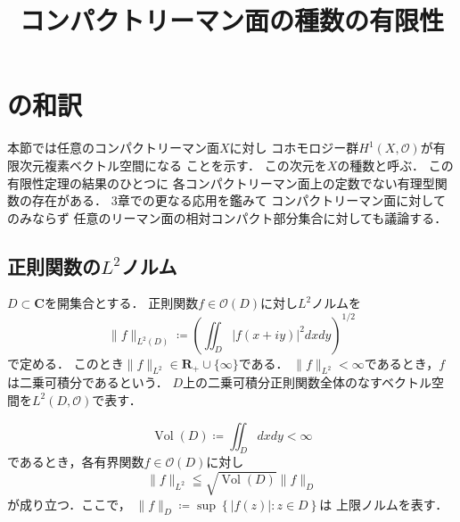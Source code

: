 \documentclass[11pt, a4paper, dvipdfmx]{jsarticle}
\theoremstyle{definition}
\newcommand{\rr}{\mathbf{R}}
\newcommand{\cc}{\mathbf{C}}
\newcommand{\mcal}{\mathcal}
\newcommand{\OO}{\mcal{O}}
\newcommand{\abs}[1]{\lvert #1 \rvert}
\newcommand{\nm}[1]{\lVert #1 \rVert}
\theoremstyle{mystyle}
\numberwithin{equation}{section} %
\newcommand{\Vol}{\mathop{\mathrm{Vol}}}
\begin{document}
\title{コンパクトリーマン面の種数の有限性}
\author{}
\date{}

\maketitle

\section{\cite[\S 14]{Fo81}の和訳}
\setcounter{section}{14}

本節では任意のコンパクトリーマン面$X$に対し
コホモロジー群$H^1(X,\OO)$が有限次元複素ベクトル空間になる
ことを示す．
この次元を$X$の種数と呼ぶ．
この有限性定理の結果のひとつに
各コンパクトリーマン面上の定数でない有理型関数の存在がある．
3章での更なる応用を鑑みて
コンパクトリーマン面に対してのみならず
任意のリーマン面の相対コンパクト部分集合に対しても議論する．

\subsection{正則関数の$L^2$ノルム}
$D\subset \cc$を開集合とする．
正則関数$f\in\OO(D)$に対し$L^2$ノルムを
\begin{equation*}
  \nm{f}_{L^2(D)}
  \coloneqq\left(\iint_{D}\abs{f(x+iy)}^2dxdy\right)^{1/2}
\end{equation*}
で定める．
このとき$\nm{f}_{L^{2}}\in\rr_+\cup\{\infty\}$である．
$\nm{f}_{L^{2}}<\infty$であるとき，$f$は二乗可積分であるという．
$D$上の二乗可積分正則関数全体のなすベクトル空間を$L^2(D,\OO)$で表す．

\begin{equation*}
  \Vol(D)\coloneqq\iint_Ddxdy<\infty  
\end{equation*}
であるとき，各有界関数$f\in\OO(D)$に対し
\begin{equation*}
  \nm{f}_{L^{2}}\leqq\sqrt{\Vol(D)}\nm{f}_{D}
\end{equation*}
が成り立つ．ここで，
$\nm{f}_{D}\coloneqq\sup\left\{\abs{f(z)}:z\in D\right\}$は
上限ノルムを表す．
\end{document}
